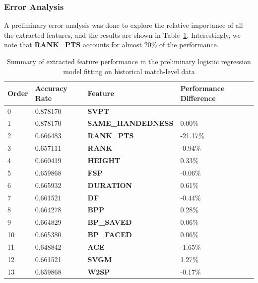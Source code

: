 \documentclass[paper=a4, fontsize=11pt]{scrartcl} %
\numberwithin{equation}{section} %
\numberwithin{figure}{section} %
\numberwithin{table}{section} %
\begin{document}
\subsubsection{Error Analysis}
A preliminary error analysis was done to explore the relative importance of all the extracted features, and the results are shown in Table~\ref{tab:logreg}. Interestingly, we note that \textbf{RANK\_PTS} accounts for almost $20\%$ of the performance. 
\begin{center}
\begin{table}[h]
    \begin{tabular}{  l | l | l | p{5cm} }
    \hline
Order &     Accuracy Rate    &         Feature    &  Performance Difference \\ \hline
0    &    0.878170 &              \textbf{SVPT}  &      \\ \hline
1    &    0.878170 &        \textbf{SAME\_HANDEDNESS}  & 0.00\% \\ \hline
2    &    0.666483 &          \textbf{RANK\_PTS} & -21.17\% \\ \hline
3    &    0.657111 &              \textbf{RANK} & -0.94\% \\ \hline
4    &    0.660419 &            \textbf{HEIGHT} & 0.33\% \\ \hline
5    &    0.659868 &  \textbf{FSP} & -0.06\% \\ \hline
6    &    0.665932 &       \textbf{DURATION} &  0.61\% \\ \hline
7    &    0.661521 &                \textbf{DF} & -0.44\% \\ \hline
8    &    0.664278 &    \textbf{BPP} &  0.28\% \\ \hline
9    &    0.664829 &         \textbf{BP\_SAVED} &  0.06\% \\ \hline
10   &    0.665380 &          \textbf{BP\_FACED}  & 0.06\% \\ \hline
11   &    0.648842 &    \textbf{ACE} & -1.65\% \\ \hline
12   &    0.661521 &             \textbf{SVGM} & 1.27\% \\ \hline
13   &    0.659868 & \textbf{W2SP} & -0.17\% \\ \hline
    \end{tabular}
    \caption{Summary of extracted feature performance in the preliminary logistic regression model fitting on historical match-level data}
    \label{tab:logreg}
    \end{table}
\end{center}
\end{document}
